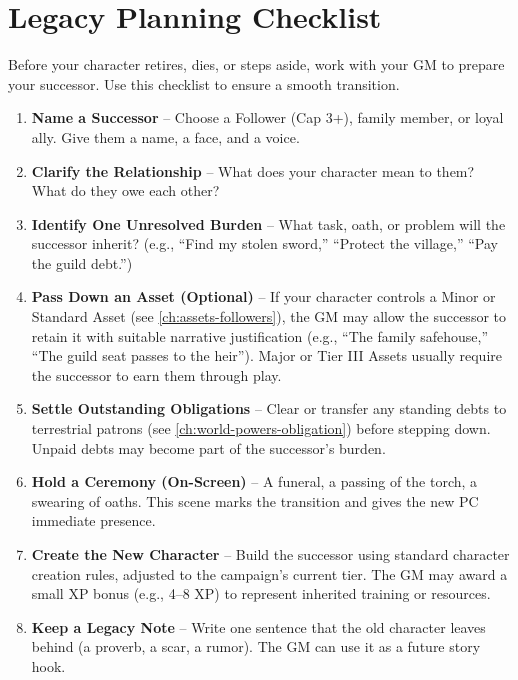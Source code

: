 \section{Legacy Planning Checklist}
\label{sec:legacy-checklist}

Before your character retires, dies, or steps aside, work with your GM to prepare your successor. Use this checklist to ensure a smooth transition.

\begin{tcolorbox}[colback=green!5!white,colframe=green!75!black,title=Player's Legacy Planning Checklist,fonttitle=\bfseries,breakable]
\begin{enumerate}
  \item \textbf{Name a Successor} -- Choose a Follower (Cap 3+), family member, or loyal ally. Give them a name, a face, and a voice.
  \item \textbf{Clarify the Relationship} -- What does your character mean to them? What do they owe each other?
  \item \textbf{Identify One Unresolved Burden} -- What task, oath, or problem will the successor inherit? (e.g., ``Find my stolen sword,'' ``Protect the village,'' ``Pay the guild debt.'')
  \item \textbf{Pass Down an Asset (Optional)} -- If your character controls a Minor or Standard Asset (see \ref{ch:assets-followers}), the GM may allow the successor to retain it with suitable narrative justification (e.g., ``The family safehouse,'' ``The guild seat passes to the heir''). Major or Tier III Assets usually require the successor to earn them through play.
  \item \textbf{Settle Outstanding Obligations} -- Clear or transfer any standing debts to terrestrial patrons (see \ref{ch:world-powers-obligation}) before stepping down. Unpaid debts may become part of the successor's burden.
  \item \textbf{Hold a Ceremony (On-Screen)} -- A funeral, a passing of the torch, a swearing of oaths. This scene marks the transition and gives the new PC immediate presence.
  \item \textbf{Create the New Character} -- Build the successor using standard character creation rules, adjusted to the campaign's current tier. The GM may award a small XP bonus (e.g., 4--8 XP) to represent inherited training or resources.
  \item \textbf{Keep a Legacy Note} -- Write one sentence that the old character leaves behind (a proverb, a scar, a rumor). The GM can use it as a future story hook.
\end{enumerate}
\end{tcolorbox}

